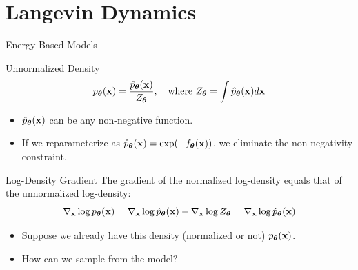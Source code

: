 \documentclass{beamer}
\begin{document}
\section{Langevin Dynamics}
\begin{frame}{Energy-Based Models}
	\begin{block}{Unnormalized Density}
		\vspace{-0.2cm}
		\[
			p_{\boldsymbol{\theta}}(\mathbf{x}) = \frac{\hat{p}_{\boldsymbol{\theta}}(\mathbf{x})}{Z_{\boldsymbol{\theta}}}, \quad \text{where } Z_{\boldsymbol{\theta}} = \int \hat{p}_{\boldsymbol{\theta}}(\mathbf{x}) d \mathbf{x}
		\]
		\vspace{-0.3cm}
		\begin{itemize}
			\item $\hat{p}_{\boldsymbol{\theta}}(\mathbf{x})$ can be any non-negative function. \\
			\item If we reparameterize as $\hat{p}_{\boldsymbol{\theta}}(\mathbf{x}) = \exp(-f_{\boldsymbol{\theta}}(\mathbf{x}))$, we eliminate the non-negativity constraint.
		\end{itemize}
	\end{block}
	\eqpause
	\vspace{-0.3cm}
	\begin{block}{Log-Density Gradient}
		The gradient of the normalized log-density equals that of the unnormalized log-density:
		\[
			\nabla_{\mathbf{x}} \log p_{\boldsymbol{\theta}}(\mathbf{x}) = \nabla_{\mathbf{x}} \log \hat{p}_{\boldsymbol{\theta}}(\mathbf{x}) - \nabla_{\mathbf{x}} \log Z_{\boldsymbol{\theta}} = \nabla_{\mathbf{x}} \log \hat{p}_{\boldsymbol{\theta}}(\mathbf{x})
		\]
	\end{block}
	\eqpause
	\vspace{-0.3cm}
	\begin{itemize}
		\item Suppose we already have this density (normalized or not) $p_{\boldsymbol{\theta}}(\mathbf{x})$.
		\item How can we sample from the model?
	\end{itemize}
\end{frame}
\end{document}
